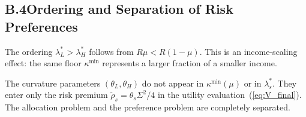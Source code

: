 \documentclass[12pt,a4paper]{article}
\begin{document}
\subsection*{B.4\quad Ordering and Separation of Risk Preferences}

The ordering $\lambda_L^* > \lambda_H^*$ follows from $R\mu < R(1-\mu)$.
This is an income-scaling effect: the same floor $\kappa^{\min}$
represents a larger fraction of a smaller income.

The curvature parameters $(\theta_L, \theta_H)$ do not appear in
$\kappa^{\min}(\mu)$ or in $\lambda_s^*$. They enter only the risk
premium $\tilde\rho_s = \theta_s\Sigma^2/4$ in the utility
evaluation~(\ref{eq:V_final}). The allocation problem and the
preference problem are completely separated.
\end{document}
